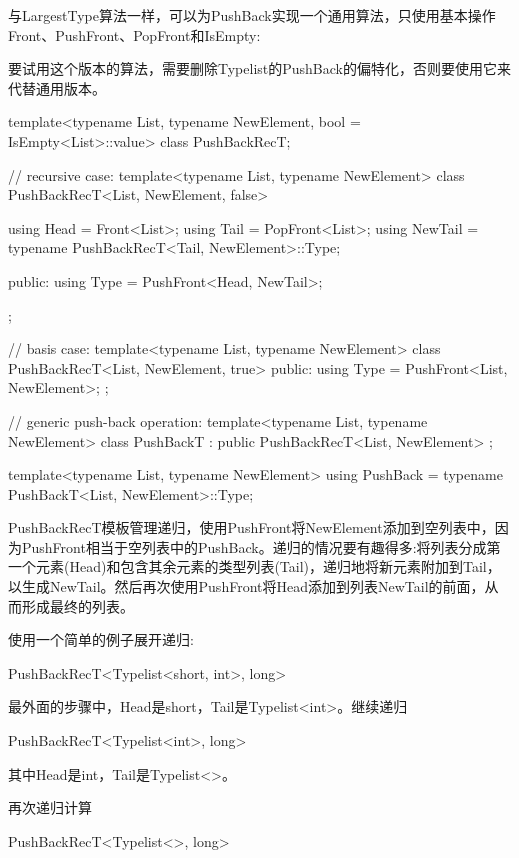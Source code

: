 与LargestType算法一样，可以为PushBack实现一个通用算法，只使用基本操作Front、PushFront、PopFront和IsEmpty:

\begin{notice}要试用这个版本的算法，需要删除Typelist的PushBack的偏特化，否则要使用它来代替通用版本。
\end{notice}

\begin{cpp}
template<typename List, typename NewElement, bool = IsEmpty<List>::value>
class PushBackRecT;

// recursive case:
template<typename List, typename NewElement>
class PushBackRecT<List, NewElement, false>
{
	using Head = Front<List>;
	using Tail = PopFront<List>;
	using NewTail = typename PushBackRecT<Tail, NewElement>::Type;
	
	public:
	using Type = PushFront<Head, NewTail>;
};

// basis case:
template<typename List, typename NewElement>
class PushBackRecT<List, NewElement, true>
{
	public:
	using Type = PushFront<List, NewElement>;
};

// generic push-back operation:
template<typename List, typename NewElement>
class PushBackT : public PushBackRecT<List, NewElement> { };

template<typename List, typename NewElement>
using PushBack = typename PushBackT<List, NewElement>::Type;
\end{cpp}

PushBackRecT模板管理递归，使用PushFront将NewElement添加到空列表中，因为PushFront相当于空列表中的PushBack。递归的情况要有趣得多:将列表分成第一个元素(Head)和包含其余元素的类型列表(Tail)，递归地将新元素附加到Tail，以生成NewTail。然后再次使用PushFront将Head添加到列表NewTail的前面，从而形成最终的列表。

使用一个简单的例子展开递归:

\begin{cpp}
PushBackRecT<Typelist<short, int>, long>
\end{cpp}

最外面的步骤中，Head是short，Tail是Typelist<int>。继续递归

\begin{cpp}
PushBackRecT<Typelist<int>, long>
\end{cpp}

其中Head是int，Tail是Typelist<>。

再次递归计算

\begin{cpp}
PushBackRecT<Typelist<>, long>
\end{cpp}

